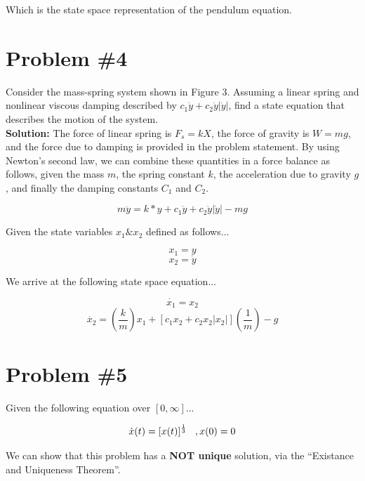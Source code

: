 \documentclass[12px]{article}
\begin{document}
    Which is the state space representation of the pendulum equation.













    \section{Problem \#4}

    Consider the mass-spring system shown in Figure 3. Assuming a linear spring and nonlinear viscous damping described by $ c_{1}\dot{y} + c_{2}\dot{y}|\dot{y}|$, find a state equation that describes the motion of the system. \\



    \textbf{Solution:} The force of linear spring is $F_{s} = kX$, the force of gravity is $ W=mg$, and the force due to damping is provided in the problem statement. By using Newton's second law, we can combine these quantities in a force balance as follows, given the mass $m$, the spring constant $k$, the acceleration due to gravity $g$, and finally the damping constants $C_{1}$ and $ C_{2}$.

    $$ m\ddot{y} = k*y + c_{1}\dot{y} + c_{2}\dot{y}|\dot{y}| -mg $$

    Given the state variables $x_{1} \& x_{2}$ defined as follows...

    \[ x_{1} = y \]
    \[ x_{2} = \dot{y} \]

    We arrive at the following state space equation...

    \[ \dot{x_{1}} = x_{2}\]
    \[ \dot{x_{2}} = \left( \frac{k}{m} \right)x_{1}  + \left[ c_{1}x_{2} + c_{2}x_{2}|x_{2}| \right]  \left( \frac{1}{m} \right) -g \]

    \section{Problem \#5}

    Given the following equation over $[0, \infty]$...

    $$
    \dot{x}(t) = [x(t)]^{\frac{1}{3}} \hspace{.3cm}, x(0) =0\\
    $$

    We can show that this problem has a \textbf{NOT unique} solution, via the ``Existance and Uniqueness Theorem''. \\
\end{document}
